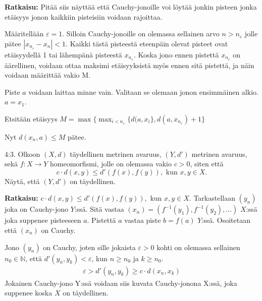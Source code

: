\documentclass[12pt,a4paper,leqno]{amsart}
\begin{document}
\textbf{Ratkaisu: }
Pitää siis näyttää että Cauchy-jonoille voi löytää jonkin pisteen jonka etäisyys jonon kaikkiin pisteisiin voidaan rajoittaa.


Määritellään $\varepsilon=1$. Silloin Cauchy-jonoille on olemassa sellainen arvo $n > n_\varepsilon$ jolle pätee $| x_{n_\varepsilon} - x_n | < 1$. Kaikki tästä pisteestä eteenpäin olevat pisteet ovat etäisyydellä 1 tai lähempänä pisteestä $x_{n_\varepsilon}$. Koska jono ennen pistettä $x_{n_\varepsilon}$ on äärellinen, voidaan ottaa maksimi etäisyyksistä myös ennen sitä pistettä, ja näin voidaan määrittää vakio M.

Piste $a$ voidaan laittaa minne vain. Valitaan se olemaan jonon ensimmäinen alkio. $a = x_1$.

Etsitään etäisyys $M = \max \{ \max_{i < n_\varepsilon} \{ d(a, x_i\}, d(a, x_{n_\varepsilon}) + 1\}$

Nyt $d(x_n,a) \le M$ pätee.


\bigskip

4:3. Olkoon $(X,d)$ täydellinen metrinen avaruus, $(Y,d')$ metrinen avaruus, sekä 
$f: X \to Y$ homeomorfismi, jolle on olemassa vakio $c > 0$, siten että
\[
c \cdot d(x,y) \le d'(f(x),f(y)),  \textrm{ kun } x, y \in X.
\] 
Näytä, että  $(Y,d')$  on täydellinen.


\textbf{Ratkaisu:}
$c \cdot d(x,y) \le d'(f(x),f(y)),  \textrm{ kun } x, y \in X.$
Tarkastellaan $(y_n)$ joka on Cauchy-jono $Y$:ssä. Sitä vastaa $(x_n) = (f^{-1}(y_1), f^{-1}(y_2), ...)$ $X$:ssä joka suppenee pisteeseen $a$. Pistettä $a$ vastaa piste $b=f(a)$ $Y$:ssä. Osoitetaan että $(x_n)$ on Cauchy. 

Jono $(y_n)$ on Cauchy, joten sille jokaista $\varepsilon > 0$ kohti on olemassa sellainen $n_0 \in \mathbb{N}$, että $d'(y_n, y_k) < \varepsilon$, kun $n \geq n_0$ ja $k \geq n_0$.
\begin{align*}
    \varepsilon > d'(y_n, y_k) \geq c \cdot d(x_n, x_k)
\end{align*}
Jokainen Cauchy-jono Y:ssä voidaan siis kuvata Cauchy-jonona X:ssä, joka suppenee koska $X$ on täydellinen. 
\end{document}
